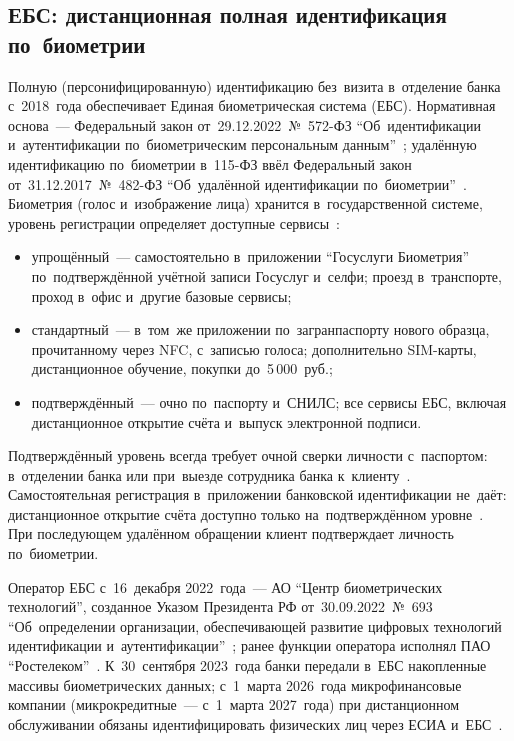 \subsection*{ЕБС: дистанционная полная идентификация по~биометрии}

Полную (персонифицированную) идентификацию без~визита в~отделение банка
с~2018~года обеспечивает Единая биометрическая система (ЕБС). Нормативная
основа~--- Федеральный закон от~29.12.2022~№~572-ФЗ \enquote{Об~идентификации
и~аутентификации по~биометрическим персональным данным}~\cite{fz-572};
удалённую идентификацию по~биометрии в~115-ФЗ ввёл Федеральный закон
от~31.12.2017~№~482-ФЗ \enquote{Об~удалённой идентификации по~биометрии}~\cite{fz-482,fz-115}.
Биометрия (голос и~изображение лица) хранится в~государственной системе,
уровень регистрации определяет доступные сервисы~\cite{ebs-app,rg-biometrics-levels-2024}:
\begin{itemize}
  \item упрощённый~--- самостоятельно в~приложении \enquote{Госуслуги Биометрия}
    по~подтверждённой учётной записи Госуслуг и~селфи; проезд в~транспорте,
    проход в~офис и~другие базовые сервисы;
  \item стандартный~--- в~том~же приложении по~загранпаспорту нового образца,
    прочитанному через NFC, с~записью голоса; дополнительно SIM-карты,
    дистанционное обучение, покупки до~5\,000~руб.;
  \item подтверждённый~--- очно по~паспорту и~СНИЛС; все сервисы ЕБС, включая
    дистанционное открытие счёта и~выпуск электронной подписи.
\end{itemize}
Подтверждённый уровень всегда требует очной сверки личности с~паспортом:
в~отделении банка или при~выезде сотрудника банка к~клиенту~\cite{ebs-confirmed}.
Самостоятельная регистрация в~приложении банковской идентификации не~даёт:
дистанционное открытие счёта доступно только на~подтверждённом
уровне~\cite{ebs-account-fl}. При последующем удалённом обращении клиент
подтверждает личность по~биометрии.

Оператор ЕБС с~16~декабря 2022~года~--- АО \enquote{Центр биометрических
технологий}, созданное Указом Президента РФ от~30.09.2022~№~693
\enquote{Об~определении организации, обеспечивающей развитие цифровых технологий
идентификации и~аутентификации}~\cite{ukaz-693}; ранее функции
оператора исполнял ПАО \enquote{Ростелеком}~\cite{ebs-overview}. К~30~сентября
2023~года банки передали в~ЕБС накопленные массивы биометрических данных;
с~1~марта 2026~года микрофинансовые компании (микрокредитные~--- с~1~марта
2027~года) при дистанционном обслуживании обязаны идентифицировать
физических лиц через ЕСИА и~ЕБС~\cite{fz-41-2025}.

